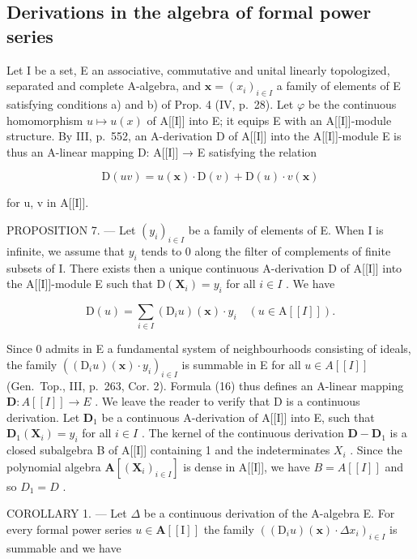 \subsection{Derivations in the algebra of formal power series}

Let I be a set, E an associative, commutative and unital linearly topologized, separated and complete A-algebra, and \(\mathbf{x} = (x_{i})_{i \in I}\) a family of elements of E satisfying conditions a) and b) of Prop. 4 (IV, p.~28). Let \(\varphi\) be the continuous homomorphism \(u \mapsto u(x)\) of A{[}{[}I{]}{]} into E; it equips E with an A{[}{[}I{]}{]}-module structure. By III, p.~552, an A-derivation D of A{[}{[}I{]}{]} into the A{[}{[}I{]}{]}-module E is thus an A-linear mapping D: A{[}{[}I{]}{]} → E satisfying the relation

\[
\mathrm{D} (u v) = u (\mathbf {x}) \cdot \mathrm{D} (v) + \mathrm{D} (u) \cdot v (\mathbf {x})\tag{15}
\]

for u, v in A{[}{[}I{]}{]}.

PROPOSITION 7. --- Let \((y_{i})_{i\in I}\) be a family of elements of E. When I is infinite, we assume that \(y_{i}\) tends to 0 along the filter of complements of finite subsets of I. There exists then a unique continuous A-derivation D of A{[}{[}I{]}{]} into the A{[}{[}I{]}{]}-module E such that \(\mathrm{D}(\mathbf{X}_{i})=y_{i}\) for all \(i\in I\) . We have

\[
\mathrm{D} (u) = \sum_ {i \in I} (\mathrm{D} _ {i} u) (\mathbf {x}) \cdot y _ {i} \quad (u \in \mathrm{A} [ [ I ] ])  .\tag{16}
\]

Since 0 admits in E a fundamental system of neighbourhoods consisting of ideals, the family \(((\mathrm{D}_i u)(\mathbf{x}) \cdot y_i)_{i \in I}\) is summable in E for all \(u \in A[[I]]\) (Gen.~Top., III, p.~263, Cor. 2). Formula (16) thus defines an A-linear mapping \(\mathbf{D}: A[[I]] \to E\) . We leave the reader to verify that D is a continuous derivation. Let \(\mathbf{D}_1\) be a continuous A-derivation of A{[}{[}I{]}{]} into E, such that \(\mathbf{D}_1(\mathbf{X}_i) = y_i\) for all \(i \in I\) . The kernel of the continuous derivation \(\mathbf{D} - \mathbf{D}_1\) is a closed subalgebra B of A{[}{[}I{]}{]} containing 1 and the indeterminates \(X_{i}\) . Since the polynomial algebra \(\mathbf{A}[(\mathbf{X}_{i})_{i\in I}]\) is dense in A{[}{[}I{]}{]}, we have \(B = A[[I]]\) and so \(D_{1} = D\) .

COROLLARY 1. --- Let \(\Delta\) be a continuous derivation of the A-algebra E. For every formal power series \(u \in \mathbf{A}[[\mathrm{I}]]\) the family \(((\mathrm{D}_i u)(\mathbf{x}) \cdot \Delta x_i)_{i \in I}\) is summable and we have

